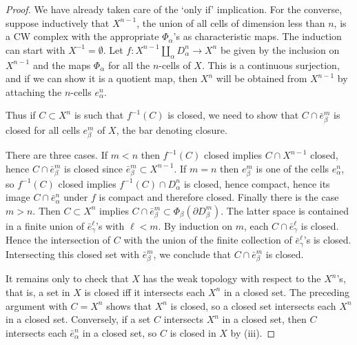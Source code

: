 \documentclass{article}
\theoremstyle{definition}
\begin{document}
\begin{proof}
We have already taken care of the `only if' implication. For the converse, suppose inductively that $X^{n-1}$, the union of all cells of dimension less than $n$, is a CW complex with the appropriate $\Phi_{\alpha}$'s as characteristic maps. The induction can start with $X^{-1} = \emptyset$. Let $f: X^{n-1} \coprod_{\alpha} D_{\alpha}^{n} \to X^{n}$ be given by the inclusion on $X^{n-1}$ and the maps $\Phi_{\alpha}$ for all the $n$-cells of $X$. This is a continuous surjection, and if we can show it is a quotient map, then $X^{n}$ will be obtained from $X^{n-1}$ by attaching the $n$-cells $e_{\alpha}^{n}$.

Thus if $C \subset X^n$ is such that $f^{-1}(C)$ is closed, we need to show that $C \cap \bar{e}_\beta^m$ is closed for all cells $e_\beta^m$ of $X$, the bar denoting closure.

There are three cases. If $m < n$ then $f^{-1}(C)$ closed implies $C \cap X^{n-1}$ closed, hence $C \cap \bar{e}_\beta^m$ is closed since $\bar{e}_\beta^m \subset X^{n-1}$. If $m = n$ then $e_\beta^m$ is one of the cells $e_\alpha^n$, so $f^{-1}(C)$ closed implies $f^{-1}(C) \cap D_\alpha^n$ is closed, hence compact, hence its image $C \cap \bar{e}_\alpha^n$ under $f$ is compact and therefore closed. Finally there is the case $m > n$. Then $C \subset X^n$ implies $C \cap \bar{e}_\beta^m \subset \Phi_\beta(\partial D_\beta^m)$. The latter space is contained in a finite union of $\bar{e}_\gamma^\ell$'s with $\ell < m$. By induction on $m$, each $C \cap \bar{e}_\gamma^\ell$ is closed. Hence the intersection of $C$ with the union of the finite collection of $\bar{e}_\gamma^\ell$'s is closed. Intersecting this closed set with $\bar{e}_\beta^m$, we conclude that $C \cap \bar{e}_\beta^m$ is closed.

It remains only to check that $X$ has the weak topology with respect to the $X^n$'s, that is, a set in $X$ is closed iff it intersects each $X^n$ in a closed set. The preceding argument with $C = X^n$ shows that $X^n$ is closed, so a closed set intersects each $X^n$ in a closed set. Conversely, if a set $C$ intersects $X^n$ in a closed set, then $C$ intersects each $\bar{e}_\alpha^n$ in a closed set, so $C$ is closed in $X$ by (iii).
\end{proof}
\end{document}
